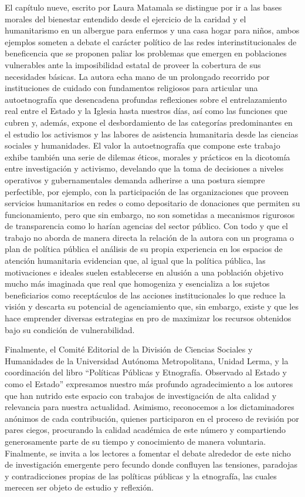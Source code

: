\documentclass[
  spanish,
  11.5pt,
  170mm x 240mmpaper,
]{scrbook}
\begin{document}
El capítulo nueve, escrito por Laura Matamala se distingue por ir a las
bases morales del bienestar entendido desde el ejercicio de la caridad y
el humanitarismo en un albergue para enfermos y una casa hogar para
niños, ambos ejemplos someten a debate el carácter político de las redes
interinstitucionales de beneficencia que se proponen paliar los
problemas que emergen en poblaciones vulnerables ante la imposibilidad
estatal de proveer la cobertura de sus necesidades básicas. La autora
echa mano de un prolongado recorrido por instituciones de cuidado con
fundamentos religiosos para articular una autoetnografía que desencadena
profundas reflexiones sobre el entrelazamiento real entre el Estado y la
Iglesia hasta nuestros días, así como las funciones que cubren y,
además, expone el desbordamiento de las categorías predominantes en el
estudio los activismos y las labores de asistencia humanitaria desde las
ciencias sociales y humanidades. El valor la autoetnografía que compone
este trabajo exhibe también una serie de dilemas éticos, morales y
prácticos en la dicotomía entre investigación y activismo, develando que
la toma de decisiones a niveles operativos y gubernamentales demanda
adherirse a una postura siempre perfectible, por ejemplo, con la
participación de las organizaciones que proveen servicios humanitarios
en redes o como depositario de donaciones que permiten su
funcionamiento, pero que sin embargo, no son sometidas a mecanismos
rigurosos de transparencia como lo harían agencias del sector público.
Con todo y que el trabajo no aborda de manera directa la relación de la
autora con un programa o plan de política pública el análisis de su
propia experiencia en los espacios de atención humanitaria evidencian
que, al igual que la política pública, las motivaciones e ideales suelen
establecerse en alusión a una población objetivo mucho más imaginada que
real que homogeniza y esencializa a los sujetos beneficiarios como
receptáculos de las acciones institucionales lo que reduce la visión y
descarta su potencial de agenciamiento que, sin embargo, existe y que
les hace emprender diversas estrategias en pro de maximizar los recursos
obtenidos bajo su condición de vulnerabilidad.

Finalmente, el Comité Editorial de la División de Ciencias Sociales y
Humanidades de la Universidad Autónoma Metropolitana, Unidad Lerma, y la
coordinación del libro ``Políticas Públicas y Etnografía. Observado al
Estado y como el Estado'' expresamos nuestro más profundo agradecimiento
a los autores que han nutrido este espacio con trabajos de investigación
de alta calidad y relevancia para nuestra actualidad. Asimismo,
reconocemos a los dictaminadores anónimos de cada contribución, quienes
participaron en el proceso de revisión por pares ciegos, procurando la
calidad académica de este número y compartiendo generosamente parte de
su tiempo y conocimiento de manera voluntaria. Finalmente, se invita a
los lectores a fomentar el debate alrededor de este nicho de
investigación emergente pero fecundo donde confluyen las tensiones,
paradojas y contradicciones propias de las políticas públicas y la
etnografía, las cuales merecen ser objeto de estudio y reflexión.
\end{document}

